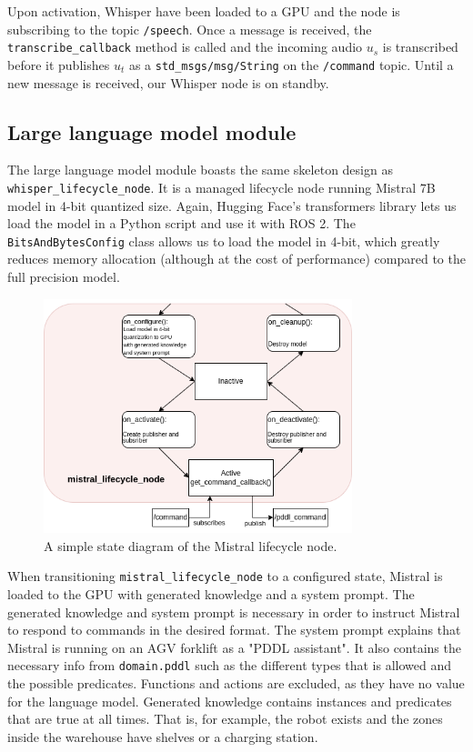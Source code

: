 Upon activation, Whisper have been loaded to a GPU and the node is subscribing to the topic \verb|/speech|. Once a message is received, the \verb|transcribe_callback| method is called and the incoming audio $u_{s}$ is transcribed before it publishes $u_{t}$ as a \verb|std_msgs/msg/String| on the \verb|/command| topic. Until a new message is received, our Whisper node is on standby.

\subsection{Large language model module}
The large language model module boasts the same skeleton design as \verb|whisper_lifecycle_node|. It is a managed lifecycle node running Mistral 7B model in 4-bit quantized size. Again, Hugging Face's transformers library lets us load the model in a Python script and use it with ROS 2. The \verb|BitsAndBytesConfig| class allows us to load the model in 4-bit, which greatly reduces memory allocation (although at the cost of performance) compared to the full precision model.

\begin{figure}[ht]
    \centering
    \includegraphics[width=0.8\textwidth]{figures/mistral_lifecycle.png}
    \caption[Mistral lifecycle node]{A simple state diagram of the Mistral lifecycle node.}
    \label{fig:mistral_lifecycle}
\end{figure}

When transitioning \verb|mistral_lifecycle_node| to a configured state, Mistral is loaded to the GPU with generated knowledge and a system prompt. The generated knowledge and system prompt is necessary in order to instruct Mistral to respond to commands in the desired format. The system prompt explains that Mistral is running on an AGV forklift as a "PDDL assistant". It also contains the necessary info from \verb|domain.pddl| such as the different types that is allowed and the possible predicates. Functions and actions are excluded, as they have no value for the language model.
Generated knowledge contains instances and predicates that are true at all times. That is, for example, the robot exists and the zones inside the warehouse have shelves or a charging station.

